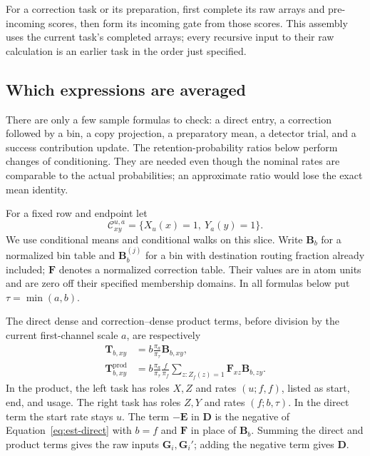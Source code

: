 \documentclass[11pt]{article}
\numberwithin{equation}{section}
\theoremstyle{definition}
\theoremstyle{remark}
\begin{document}
For a correction task or its preparation, first complete its raw arrays
and pre-incoming scores, then form its incoming gate from those scores.
This assembly uses the current task's completed arrays; every recursive
input to their raw calculation is an earlier task in the order just
specified.

\subsection{Which expressions are averaged}

There are only a few sample formulas to check: a direct entry, a correction followed by a bin, a copy projection, a preparatory mean, a detector trial, and a success contribution update. The retention-probability ratios below perform changes of conditioning. They are needed even though the nominal rates are comparable to the actual probabilities; an approximate ratio would lose the exact mean identity.

For a fixed row and endpoint let
\[
 \mathcal C_{xy}^{u,a}=\{X_u(x)=1,\ Y_a(y)=1\}.
\]
We use conditional means and conditional walks on this slice.  Write
${\mathbf{B}}_b$ for a normalized bin table and ${\mathbf{B}}_b^{(j)}$ for a
bin with destination routing fraction already included; ${\mathbf{F}}$
denotes a normalized correction table.  Their values are in atom units
and are zero off their specified membership domains.  In all formulas
below put $\tau=\min(a,b)$.

The direct dense and correction--dense product terms, before division by
the current first-channel scale $a$, are respectively
\begin{align}
 {\mathbf{T}}_{b,xy}&=b\frac{\pi_a}{\pi_\tau}{\mathbf{B}}_{b,xy},
 \label{eq:est-direct}\\
 {\mathbf{T}}^{\mathrm{prod}}_{b,xy}&=
 b\frac{\pi_a}{\pi_\tau}\frac f{\pi_f}
 \sum_{z:Z_f(z)=1}{\mathbf{F}}_{xz}{\mathbf{B}}_{b,zy}.
 \label{eq:est-product}
\end{align}
In the product, the left task has roles $X,Z$ and rates
$(u;f,f)$, listed as start, end, and usage.  The right task has roles
$Z,Y$ and rates $(f;b,\tau)$.  In the direct term the start rate stays $u$.
The term $-{\mathbf{E}}$ in ${\mathbf{D}}$ is the negative of
Equation~\eqref{eq:est-direct} with $b=f$ and ${\mathbf{F}}$ in place of
${\mathbf{B}}_b$.  Summing the direct and product terms gives the raw inputs
${\mathbf{G}}_i,{\mathbf{G}}_i'$; adding the negative term gives ${\mathbf{D}}$.
\end{document}
